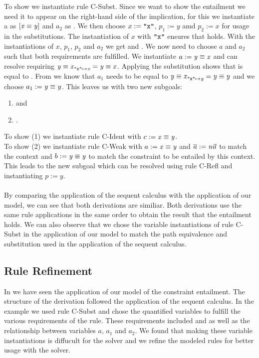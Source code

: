 \begin{example}
To show  we instantiate rule C-Subst.
Since we want to show the entailment we need it to appear on the right-hand side of the implication,
for this we instantiate \ovl a as $[\mathit{x} \equiv \mathit{y}]$ and $a_2$ as .
We then choose $x := \texttt{"x"}$, $p_1 := y$ amd $p_2 := x$ for usage in the substitutions.
The instantiation of $x$ with $\texttt{"x"}$ ensures that  holds.
With the instantiations of $x$, $p_1$, $p_2$ and $a_2$ we get
 and .
We now need to choose $a$ and $a_2$ such that both  requirements are fulfilled.
We instantiate $a := \mathit{y} \equiv \mathit{x}$ and can resolve 
requiring $\mathit{\mathit{y} \equiv \mathit{x}}_{\mathit{\texttt{"x"}} \mapsto \mathit{x}} = \mathit{y} \equiv \mathit{x}$.
Applying the substitution shows that  is equal to .
From  we know that
$a_1$ needs to be equal to $\mathit{\mathit{y} \equiv \mathit{x}}_{\mathit{\texttt{"x"}} \mapsto \mathit{y}} = \mathit{y} \equiv \mathit{y}$
and we choose $a_1 := \mathit{y} \equiv \mathit{y}$.
This leaves us with two new subgoals:
\begin{enumerate}
    \item {} and
    \item {}.
\end{enumerate}
To show (1) we instantiate rule C-Ident with $c := \mathit{x} \equiv \mathit{y}$.\\
To show (2) we instantiate rule C-Weak with
$a := \mathit{x} \equiv \mathit{y}$ and $\overline{a} := \mathit{nil}$ to match the context
and $b := \mathit{y} \equiv \mathit{y}$ to match the constraint to be entailed by this context.
This leads to the new subgoal  which can be
resolved using rule C-Refl and instantiating $p := y$.\\
\\
By comparing the application of the sequent calculus with the application of our model,
we can see that both derivations are similiar.
Both derivations use the same rule applications in the same order to obtain the result
that the entailment holds.
We can also observe that we chose the variable instantiations of rule C-Subst
in the application of our model to match the path equivalence and substitution used
in the application of the sequent calculus.
\end{example}

\subsection{Rule Refinement}
In  we have seen the application of our model
of the constraint entailment. The structure of the derivation followed the application
of the sequent calculus.
In the example we used rule C-Subst and chose the quantified variables
to fulfill the various requirements of the rule.
These requirements included  and  as well
as the relationship between variables $a$, $a_1$ and $a_2$.
We found that making these variable instantiations is diffucult for the solver
and we refine the modeled rules for better usage with the solver.

